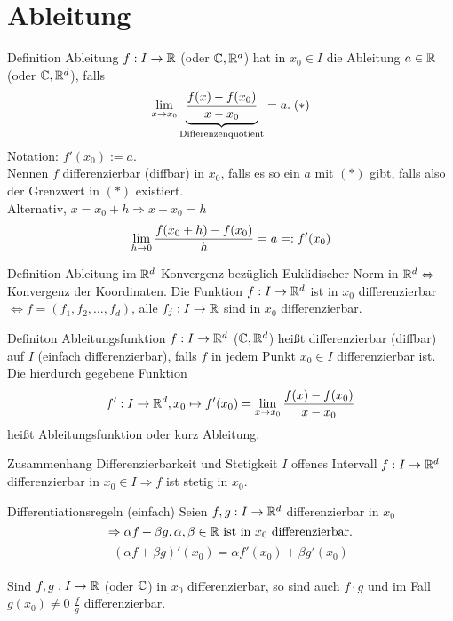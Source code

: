 \documentclass[main.tex]{subfiles}
\begin{document}
\section*{Ableitung}
\begin{karte}{Definition Ableitung}
    \( f : I \rightarrow \mathbb{R} \) (oder \( \mathbb{C}, \mathbb{R}^d \)) 
    hat in \( x_0 \in I \) die Ableitung \( a\in \mathbb{R} \) 
    (oder \( \mathbb{C}, \mathbb{R}^d \)), falls 
    \[ \lim\limits_{x\rightarrow x_0} \underbrace{\frac{f(x) - f(x_0)}{x - x_0}}_{
        \text{Differenzenquotient}
    } = a. \; (*) \]
    Notation: \( f'(x_0) := a \).\\
    Nennen \(f\) differenzierbar (diffbar) in \(x_0\), falls 
    es so ein \(a\) mit \((*)\) gibt, falls also der Grenzwert 
    in \((*)\) existiert.\\
    Alternativ, \( x = x_0 + h \Rightarrow x - x_0 = h \)
    \[ \lim\limits_{h\rightarrow 0} \frac{f(x_0 + h) - f(x_0)}{h} = a =: f'(x_0) \]    
\end{karte}
\begin{karte}{Definition Ableitung im \(\mathbb{R}^d\)}
    Konvergenz bezüglich Euklidischer Norm in \( \mathbb{R}^d 
    \Leftrightarrow \) Konvergenz der Koordinaten.
    Die Funktion \( f : I \rightarrow \mathbb{R}^d \) ist in \(x_0\) 
    differenzierbar \( \Leftrightarrow f = (f_1,f_2,\ldots,f_d) \), 
    alle \( f_j : I \rightarrow \mathbb{R} \) sind in \( x_0 \) 
    differenzierbar.
\end{karte}
\begin{karte}{Definiton Ableitungsfunktion}
    \( f : I \rightarrow \mathbb{R}^d \) (\( \mathbb{C}, \mathbb{R}^d \)) heißt 
    differenzierbar (diffbar) auf \(I\) (einfach differenzierbar), 
    falls \(f\) in jedem Punkt \( x_0 \in I \) differenzierbar ist. \\
    Die hierdurch gegebene Funktion 
    \[ f': I \rightarrow \mathbb{R}^d, x_0 \mapsto f'(x_0) 
    = \lim\limits_{x\rightarrow x_0} \frac{f(x) - f(x_0)}{x - x_0} \]
    heißt Ableitungsfunktion oder kurz Ableitung.
\end{karte}
\begin{karte}{Zusammenhang Differenzierbarkeit und Stetigkeit}
    \( I \) offenes Intervall \( f : I \rightarrow \mathbb{R}^d \) 
    differenzierbar in \( x_0 \in I \Rightarrow f \) ist stetig 
    in \(x_0\).
\end{karte}
\begin{karte}{Differentiationsregeln (einfach)}
    Seien \( f, g: I \rightarrow \mathbb{R}^d \) differenzierbar in \(x_0\)
    \[ \Rightarrow \alpha f + \beta g, \alpha, \beta \in \mathbb{R} 
    \text{ ist in } x_0 \text{ differenzierbar.} \]
    \[ (\alpha f + \beta g)'(x_0) = \alpha f'(x_0) 
        + \beta g'(x_0) \]\\
    Sind \( f, g: I \rightarrow \mathbb{R} \) (oder \( \mathbb{C} \)) in \(x_0\)
    differenzierbar, so sind auch \( f\cdot g \) und im Fall 
    \( g(x_0) \neq 0 \) \( \frac{f}{g} \) differenzierbar.
\end{karte}
\end{document}
